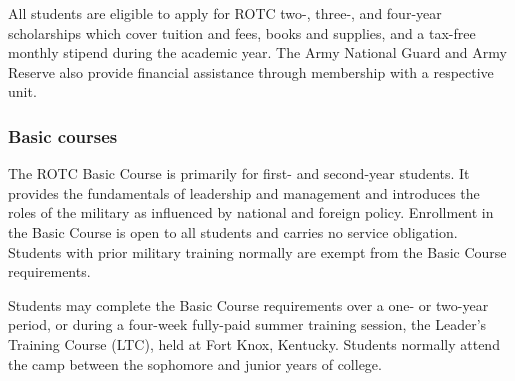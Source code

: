 \documentclass[
  letterpaper,
]{scrbook}
\begin{document}
All students are eligible to apply for ROTC two-, three-, and four-year
scholarships which cover tuition and fees, books and supplies, and a
tax-free monthly stipend during the academic year. The Army National
Guard and Army Reserve also provide financial assistance through
membership with a respective unit.

\subsubsection*{Basic courses}\label{basic-courses}

The ROTC Basic Course is primarily for first- and second-year students.
It provides the fundamentals of leadership and management and introduces
the roles of the military as influenced by national and foreign policy.
Enrollment in the Basic Course is open to all students and carries no
service obligation. Students with prior military training normally are
exempt from the Basic Course requirements.

Students may complete the Basic Course requirements over a one- or
two-year period, or during a four-week fully-paid summer training
session, the Leader's Training Course (LTC), held at Fort Knox,
Kentucky. Students normally attend the camp between the sophomore and
junior years of college.
\end{document}
